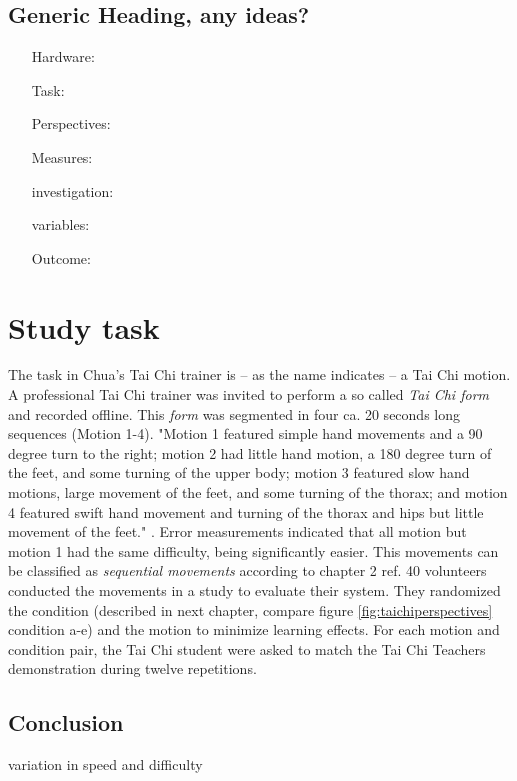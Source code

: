 \subsection{Generic Heading, any ideas? \todo}
\begin{itemize}
	\item[Hardware:] 
	\item[Task:] 
	\item[Perspectives:] 
	\item[Measures:] 
	\item[investigation:] 
	\item[variables:] 
	\item[Outcome:] 
\end{itemize}

\section{Study task}
The task in Chua's \cite{Chua} Tai Chi trainer is \--- as the name indicates \--- a Tai Chi motion. A professional Tai Chi trainer was invited to perform a so called \textit{Tai Chi form} and recorded offline. This \textit{form} was segmented in four ca. 20 seconds long sequences (Motion 1-4). "Motion 1 featured simple hand movements and a 90 degree turn to the right; motion 2 had little hand motion, a 180 degree turn of the feet, and some turning of the upper body; motion 3 featured slow hand motions, large movement of the feet, and some turning of the thorax; and motion 4 featured swift hand movement and turning of the thorax and hips but little movement of the feet." \cite{Chua}. Error measurements indicated that all motion but motion 1 had the same difficulty, being significantly easier. This movements can be classified as \textit{sequential movements} according to chapter 2 \todo ref. 40 volunteers conducted the movements in a study to evaluate their system. They randomized the condition (described in next chapter, compare figure \ref{fig:taichiperspectives} condition a-e) and the motion to minimize learning effects. For each motion and condition pair, the Tai Chi student were asked to match the Tai Chi Teachers demonstration during twelve repetitions.

\subsection{Conclusion}
variation in speed and difficulty

